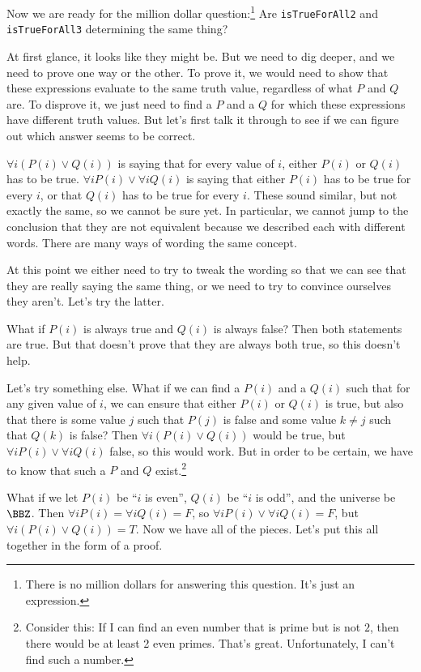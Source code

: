 \begin{exa}
Now we are ready for the million dollar 
question:\footnote{There is no million dollars for answering this question.  It's just an expression.}
 Are \verb+isTrueForAll2+ and \verb+isTrueForAll3+ determining the same thing?
\begin{sol}
At first glance, it looks like they might be.  But we need to dig deeper, and we need to prove one way or the other.
To prove it, we would need to show that these expressions evaluate to the same truth value, regardless of what $P$ and $Q$ are.   
To disprove it, we just need to find a $P$ and a $Q$ for which these expressions have different truth values.
But let's first talk it through to see if we can figure out which answer seems to be correct.

$\forall i(P(i)\vee Q(i))$ is saying that for every value of $i$, either $P(i)$ or $Q(i)$ has to be true.
$\forall i P(i) \vee \forall i Q(i)$ is saying that either $P(i)$ has to be true for every $i$, or that
$Q(i)$ has to be true for every $i$.  These sound similar, but not exactly the same, so we cannot be sure yet.
In particular, we cannot jump to the conclusion that they are not equivalent because we described each with
different words.  There are many ways of wording the same concept. 

At this point we either need to try to tweak the wording so that we can see that they are really saying the same
thing, or we need to try to convince ourselves they aren't.  
Let's try the latter.

What if $P(i)$ is always true and $Q(i)$ is always false?  
Then  both statements are true.  But that doesn't prove that they are always both true, so this doesn't help.

Let's try something else.  
What if we can find a $P(i)$ and a $Q(i)$ such that for any given value of $i$, we
can ensure that either $P(i)$ or $Q(i)$ is true, but also that there is some value $j$ such that $P(j)$ is false
and some value $k\neq j$ such that $Q(k)$ is false?  
Then $\forall i(P(i)\vee Q(i))$ would be true, but $\forall i P(i) \vee \forall i Q(i)$ false, so this would work. 
But in order to be certain, 
we have to know that such a $P$ and $Q$ exist.\footnote{Consider this:  If I can find an even number
that is prime but is not $2$, then there would be at least 2 even primes.  That's great.  Unfortunately, 
I can't find such a number.}

What if we let $P(i)$ be ``$i$ is even'', $Q(i)$ be ``$i$ is odd'', and
the universe be $\BBZ$.  
Then $\forall i P(i) = \forall i Q(i) = F$, so $\forall i P(i) \vee \forall i Q(i)=F$, 
but  $\forall i(P(i)\vee Q(i))=T$. 
Now we have all of the pieces.  Let's put this all together in the form of a proof.


\end{sol}
\end{exa}
